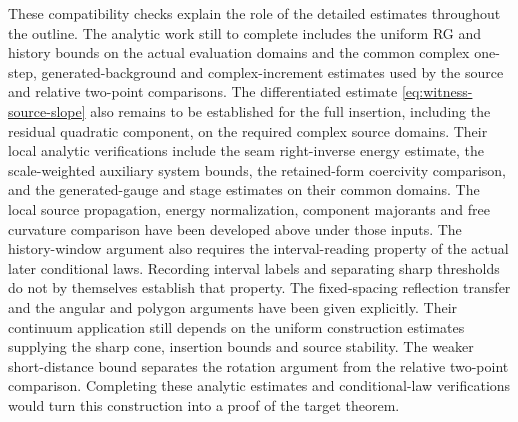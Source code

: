 \documentclass[11pt,letterpaper,reqno]{amsart}
\theoremstyle{definition}
\theoremstyle{remark}
\begin{document}
These compatibility checks explain the role of the detailed estimates
throughout the outline. The analytic work still to complete includes
the uniform RG and history bounds on the actual evaluation domains
and the common complex one-step, generated-background and
complex-increment estimates used by the source and relative
two-point comparisons. The differentiated estimate
\eqref{eq:witness-source-slope} also remains to be established for
the full insertion, including the residual quadratic component,
on the required complex source domains.
Their local analytic verifications include
the seam right-inverse energy estimate, the scale-weighted auxiliary
system bounds, the retained-form coercivity comparison, and the
generated-gauge and stage estimates on their common domains. The local source propagation, energy
normalization, component majorants and free curvature comparison
have been developed above under those inputs. The history-window
argument also requires the interval-reading property of the actual
later conditional laws. Recording interval labels and separating
sharp thresholds do not by themselves establish that property.
The fixed-spacing reflection transfer and the angular and polygon
arguments have been given explicitly. Their continuum application
still depends on the uniform construction estimates supplying the
sharp cone, insertion bounds and source stability. The weaker
short-distance bound separates the rotation argument from the
relative two-point comparison. Completing these analytic estimates
and conditional-law verifications would turn this construction into a proof of the target
theorem.
\end{document}
